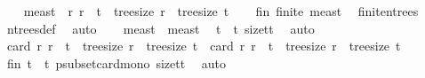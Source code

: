 \begin{isabellebody}
\ \ \isamarkupfalse%
\ {\isacharquery}{\kern0pt}meas{\isacharunderscore}{\kern0pt}t\ {\isacharequal}{\kern0pt}\ {\isachardoublequoteopen}{\isacharbraceleft}{\kern0pt}r{\isachardot}{\kern0pt}\ r\ {\isacharless}{\kern0pt}\ t\ {\isasymand}\ tree{\isacharunderscore}{\kern0pt}size\ r\ {\isacharequal}{\kern0pt}\ tree{\isacharunderscore}{\kern0pt}size\ t{\isacharbraceright}{\kern0pt}{\isachardoublequoteclose}\isanewline
\ \ \isamarkupfalse%
\ fin{\isacharcolon}{\kern0pt}\ {\isachardoublequoteopen}finite\ {\isacharquery}{\kern0pt}meas{\isacharunderscore}{\kern0pt}t{\isachardoublequoteclose}\ \isamarkupfalse%
\ finite{\isacharunderscore}{\kern0pt}n{\isacharunderscore}{\kern0pt}trees\ \isamarkupfalse%
\ n{\isacharunderscore}{\kern0pt}trees{\isacharunderscore}{\kern0pt}def\ \isamarkupfalse%
\ auto\isanewline
\ \ \isamarkupfalse%
\ {\isachardoublequoteopen}{\isacharquery}{\kern0pt}meas{\isacharunderscore}{\kern0pt}t{\isacharprime}{\kern0pt}\ {\isasymsubseteq}\ {\isacharquery}{\kern0pt}meas{\isacharunderscore}{\kern0pt}t{\isachardoublequoteclose}\ \isamarkupfalse%
\ {\isacartoucheopen}t{\isacharprime}{\kern0pt}\ {\isacharless}{\kern0pt}\ t{\isacartoucheclose}\ size{\isacharunderscore}{\kern0pt}t{\isacharprime}{\kern0pt}{\isacharunderscore}{\kern0pt}t\ \isamarkupfalse%
\ auto\isanewline
\ \ \isamarkupfalse%
\ \isamarkupfalse%
\ {\isachardoublequoteopen}card\ {\isacharbraceleft}{\kern0pt}r{\isachardot}{\kern0pt}\ r\ {\isacharless}{\kern0pt}\ t{\isacharprime}{\kern0pt}\ {\isasymand}\ tree{\isacharunderscore}{\kern0pt}size\ r\ {\isacharequal}{\kern0pt}\ tree{\isacharunderscore}{\kern0pt}size\ t{\isacharprime}{\kern0pt}{\isacharbraceright}{\kern0pt}\ {\isacharless}{\kern0pt}\ card\ {\isacharbraceleft}{\kern0pt}r{\isachardot}{\kern0pt}\ r\ {\isacharless}{\kern0pt}\ t\ {\isasymand}\ tree{\isacharunderscore}{\kern0pt}size\ r\ {\isacharequal}{\kern0pt}\ tree{\isacharunderscore}{\kern0pt}size\ t{\isacharbraceright}{\kern0pt}{\isachardoublequoteclose}\isanewline
\ \ \ \ \isamarkupfalse%
\ fin\ {\isacartoucheopen}t{\isacharprime}{\kern0pt}\ {\isacharless}{\kern0pt}\ t{\isacartoucheclose}\ psubset{\isacharunderscore}{\kern0pt}card{\isacharunderscore}{\kern0pt}mono\ size{\isacharunderscore}{\kern0pt}t{\isacharprime}{\kern0pt}{\isacharunderscore}{\kern0pt}t\ \isamarkupfalse%
\ auto\isanewline
{}\isamarkupfalse%
%
\endisatagproof
{\isafoldproof}%
%
\isadelimproof
\isanewline

\end{isabellebody}
